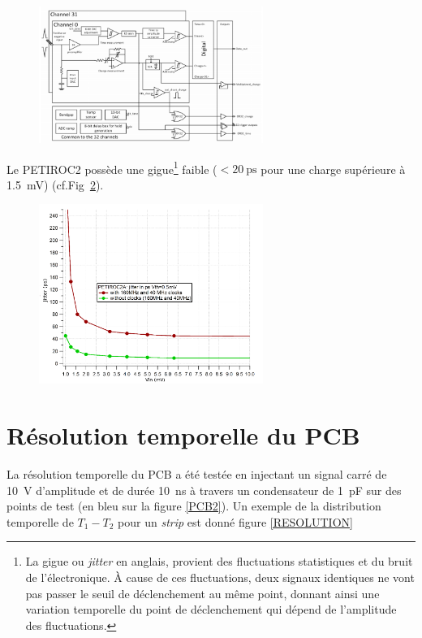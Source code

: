 \begin{figure}[ht!]
	\centering
	\includegraphics[width=0.65\textwidth]{ELE/Scheme.png}
	\label{SchemePETIROC}
\end{figure}

Le PETIROC2 possède une gigue\footnote{La gigue ou \textit{jitter} en anglais, provient des fluctuations statistiques et du bruit de l'électronique. À cause de ces fluctuations, deux signaux identiques ne vont pas passer le seuil de déclenchement au même point, donnant ainsi une variation temporelle du point de déclenchement qui dépend de l'amplitude des fluctuations.} faible ($<\SI{20}{\pico\second}$ pour une charge supérieure à \SI{1.5}{\milli\volt}) (cf.Fig~\ref{jitter}).

\begin{figure}[ht!]
	\centering
	\includegraphics[width=0.65\textwidth]{ELE/Jitter.png}
	\label{jitter}
\end{figure}

\vspace{0.4cm}
\section{Résolution temporelle du PCB}
La résolution temporelle du PCB a été testée en injectant un signal carré de \SI{10}{\volt} d'amplitude et de durée \SI{10}{\nano\second} à travers un condensateur de \SI{1}{\pico\farad} sur des points de test (en bleu sur la figure \ref{PCB2}). Un exemple de la distribution temporelle de $T_{1}-T_{2}$ pour un \textit{strip} est donné figure \ref{RESOLUTION}

